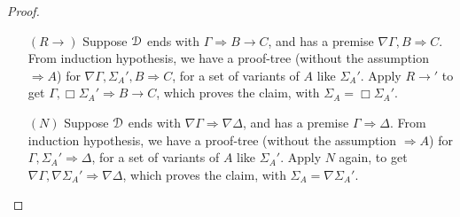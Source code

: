 \begin{proof}
\begin{enumerate}
    \item[$(R \rightarrow)$] Suppose $\mathcal{D}$ ends with $\Gamma \Rightarrow B \rightarrow C$, and has a premise $\nabla \Gamma, B \Rightarrow C$. From induction hypothesis, we have a proof-tree (without the assumption $\Rightarrow A$) for $\nabla \Gamma, \Sigma_A', B \Rightarrow C$, for a set of variants of $A$ like $\Sigma_A'$. Apply $R \rightarrow'$ to get $\Gamma, \Box \Sigma_A' \Rightarrow B \rightarrow C$, which proves the claim, with $\Sigma_A = \Box \Sigma_A'$.

    \item[$(N)$] Suppose $\mathcal{D}$ ends with $\nabla \Gamma \Rightarrow \nabla \Delta$, and has a premise $\Gamma \Rightarrow \Delta$. From induction hypothesis, we have a proof-tree (without the assumption $\Rightarrow A$) for $\Gamma, \Sigma_A' \Rightarrow \Delta$, for a set of variants of $A$ like $\Sigma_A'$. Apply $N$ again, to get $\nabla \Gamma, \nabla \Sigma_A' \Rightarrow \nabla \Delta$, which proves the claim, with $\Sigma_A = \nabla \Sigma_A'$.
  \end{enumerate}
\end{proof}